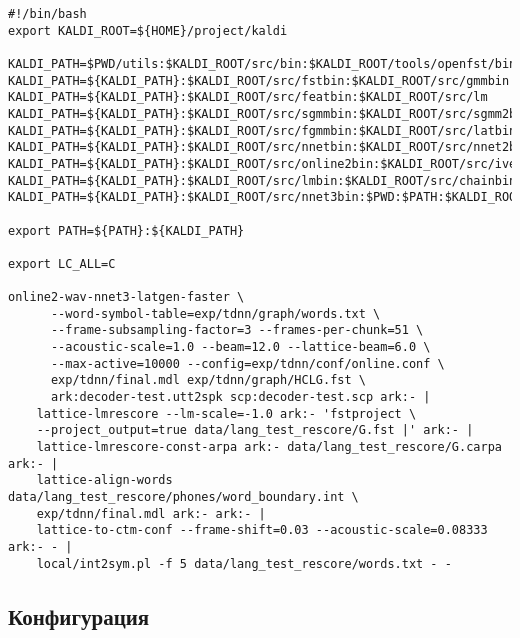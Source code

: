 \begin{lstlisting}[caption={Запуск Kaldi},label={kaldi:run},float=h]
#!/bin/bash
export KALDI_ROOT=${HOME}/project/kaldi

KALDI_PATH=$PWD/utils:$KALDI_ROOT/src/bin:$KALDI_ROOT/tools/openfst/bin
KALDI_PATH=${KALDI_PATH}:$KALDI_ROOT/src/fstbin:$KALDI_ROOT/src/gmmbin
KALDI_PATH=${KALDI_PATH}:$KALDI_ROOT/src/featbin:$KALDI_ROOT/src/lm
KALDI_PATH=${KALDI_PATH}:$KALDI_ROOT/src/sgmmbin:$KALDI_ROOT/src/sgmm2bin
KALDI_PATH=${KALDI_PATH}:$KALDI_ROOT/src/fgmmbin:$KALDI_ROOT/src/latbin
KALDI_PATH=${KALDI_PATH}:$KALDI_ROOT/src/nnetbin:$KALDI_ROOT/src/nnet2bin
KALDI_PATH=${KALDI_PATH}:$KALDI_ROOT/src/online2bin:$KALDI_ROOT/src/ivectorbin
KALDI_PATH=${KALDI_PATH}:$KALDI_ROOT/src/lmbin:$KALDI_ROOT/src/chainbin
KALDI_PATH=${KALDI_PATH}:$KALDI_ROOT/src/nnet3bin:$PWD:$PATH:$KALDI_ROOT/tools/sph2pipe_v2.5

export PATH=${PATH}:${KALDI_PATH}

export LC_ALL=C

online2-wav-nnet3-latgen-faster \
      --word-symbol-table=exp/tdnn/graph/words.txt \
      --frame-subsampling-factor=3 --frames-per-chunk=51 \
      --acoustic-scale=1.0 --beam=12.0 --lattice-beam=6.0 \
      --max-active=10000 --config=exp/tdnn/conf/online.conf \
      exp/tdnn/final.mdl exp/tdnn/graph/HCLG.fst \
      ark:decoder-test.utt2spk scp:decoder-test.scp ark:- |
    lattice-lmrescore --lm-scale=-1.0 ark:- 'fstproject \
    --project_output=true data/lang_test_rescore/G.fst |' ark:- |
    lattice-lmrescore-const-arpa ark:- data/lang_test_rescore/G.carpa ark:- |
    lattice-align-words data/lang_test_rescore/phones/word_boundary.int \
    exp/tdnn/final.mdl ark:- ark:- |
    lattice-to-ctm-conf --frame-shift=0.03 --acoustic-scale=0.08333 ark:- - |
    local/int2sym.pl -f 5 data/lang_test_rescore/words.txt - -
\end{lstlisting}

\subsection{Конфигурация}
